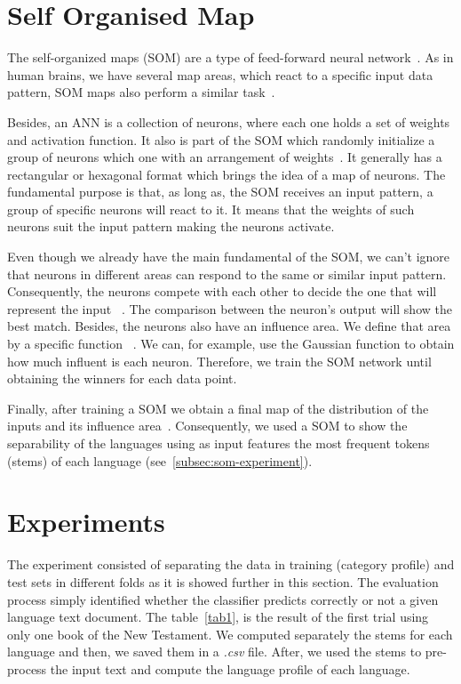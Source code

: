 \documentclass[runningheads]{llncs}
\begin{document}
    \section{Self Organised Map}\label{sec:som}
    The self-organized maps (SOM) are a type of feed-forward neural network~\cite{58325}. As in human brains, we have several map areas, which react to a specific input data pattern, SOM maps also perform a similar task~\cite{58325}.

    Besides, an ANN is a collection of neurons, where each one holds a set of weights and activation function. It also is part of the SOM which randomly initialize a group of neurons which one with an arrangement of weights~\cite{58325}. It generally has a rectangular or hexagonal format which brings the idea of a map of neurons. The fundamental purpose is that, as long as, the SOM receives an input pattern, a group of specific neurons will react to it. It means that the weights of such neurons suit the input pattern making the neurons activate.

    Even though we already have the main fundamental of the SOM, we can't ignore that neurons in different areas can respond to the same or similar input pattern. Consequently, the neurons compete with each other to decide the one that will represent the input ~\cite{58325}. The comparison between the neuron's output will show the best match.
    Besides, the neurons also have an influence area. We define that area by a specific function ~\cite{58325}. We can, for example, use the Gaussian function to obtain how much influent is each neuron. Therefore, we train the SOM network until obtaining the winners for each data point.

    Finally, after training a SOM we obtain a final map of the distribution of the inputs and its influence area~\cite{58325}.
    Consequently, we used a SOM to show the separability of the languages using as input features the most frequent tokens (stems) of each language (see~\ref{subsec:som-experiment}).

    \section{Experiments}\label{sec:results}

    The experiment consisted of separating the data in training (category profile) and test sets in different folds as it is showed further in this section.
    The evaluation process simply identified whether the classifier predicts correctly or not a given language text document. The table~\ref{tab1}, is the result of the first trial using only one book of the New Testament. We computed separately the stems for each language and then, we saved them in a \textit{.csv} file. After, we used the stems to pre-process the input text and compute the language profile of each language.
\end{document}
